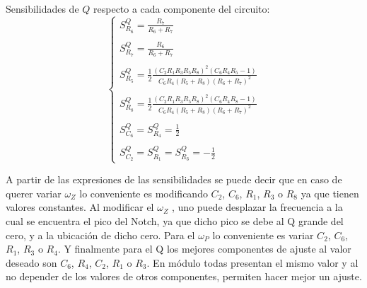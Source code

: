 Sensibilidades de $Q$ respecto a cada componente del circuito:
\begin{equation}
\begin{cases}
S^{Q}_{R_6} = \frac{R_{7}}{R_{6} + R_{7}}\\ \\
S^{Q}_{R_7} = \frac{R_{6}}{R_{6} + R_{7}}\\ \\
S^{Q}_{R_5} = \frac{1}{2} \frac{(C_{2} R_{1} R_{3} R_{5} R_{8})^2 \left(C_{6} R_{4} R_{5} - 1\right)}{C_{6} R_{4} \left(R_{5} + R_{8}\right) \left(R_{6} + R_{7}\right)^{2}} \\ \\
S^{Q}_{R_8} = \frac{1}{2} \frac{(C_{2} R_{1} R_{3} R_{5} R_{8})^2 \left(C_{6} R_{4} R_{8} - 1\right)}{C_{6} R_{4} \left(R_{5} + R_{8}\right) \left(R_{6} + R_{7}\right)^{2}} \\ \\
S^{Q}_{C_6} = S^{Q}_{R_4} =\frac{1}{2} \\ \\
S^{Q}_{C_2} = S^{Q}_{R_1} = S^{Q}_{R_3} =-\frac{1}{2}
\end{cases}
\end{equation}

A partir de las expresiones de las sensibilidades se puede decir que en caso de querer variar $\omega_Z$ lo conveniente es modificando $C_2$, $C_6$, $R_1$, $R_3$ o $R_8$ ya que tienen valores constantes. Al modificar el $\omega_Z$ , uno puede desplazar la frecuencia a la cual se encuentra el pico del Notch, ya que dicho pico se debe al Q grande del cero, y a la ubicaci\'on de dicho cero. Para el $\omega_P$ lo conveniente es variar $C_2$, $C_6$, $R_1$, $R_3$ o $R_4$. Y finalmente para el Q los mejores componentes de ajuste al valor deseado son $C_6$, $R_4$, $C_2$, $R_1$ o $R_3$. En m\'odulo todas presentan el mismo valor y al no depender de los valores de otros componentes, permiten hacer mejor un ajuste. 
